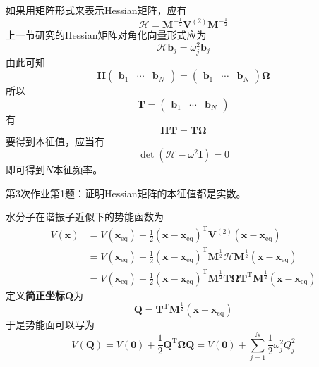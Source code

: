     如果用矩阵形式来表示Hessian矩阵，应有
    \begin{equation*}
        \bm{\mathcal{H} = M}^{-\frac 12} \bm{V}^{(2)} \bm{M}^{-\frac 12}
    \end{equation*}
    上一节研究的Hessian矩阵对角化向量形式应为
    \begin{equation*}
        \bm{\mathcal{H}b}_j = \omega_j^2 \bm{b}_j
    \end{equation*}
    由此可知 
    \begin{equation*}
        \bm{H}
        \begin{pmatrix}
            \bm{b}_1 & \cdots & \bm{b}_N
        \end{pmatrix}
        = 
        \begin{pmatrix}
            \bm{b}_1 & \cdots & \bm{b}_N
        \end{pmatrix}
        \bm{\Omega}
    \end{equation*}
    所以
    \begin{equation*}
        \bm{T} = 
        \begin{pmatrix}
            \bm{b}_1 & \cdots & \bm{b}_N
        \end{pmatrix}
    \end{equation*}
    有
    \begin{equation*}
        \bm{HT = T\Omega}
    \end{equation*}
    要得到本征值，应当有
    \begin{equation*}
        \det (\bm{\mathcal{H}}- \omega^2 \bm{I}) = 0
    \end{equation*}
    即可得到$N$本征频率。
    \begin{asg}
        第3次作业第1题：证明Hessian矩阵的本征值都是实数。
    \end{asg}

    水分子在谐振子近似下的势能函数为
    \begin{align*}
        V(\bm{x}) &= V(\bm{x}_\mathrm{eq}) + \frac 12 (\bm{x-x}_\mathrm{eq})^\mathrm{T} \bm{V}^{(2)} (\bm{x-x}_\mathrm{eq})\\
        &= V(\bm{x}_\mathrm{eq}) + \frac 12 (\bm{x-x}_\mathrm{eq})^\mathrm{T} \bm{M}^{\frac 12}\bm{\mathcal{H}} \bm{M}^{\frac 12} (\bm{x-x}_\mathrm{eq})\\
        &= V(\bm{x}_\mathrm{eq}) + \frac 12 (\bm{x-x}_\mathrm{eq})^\mathrm{T} \bm{M}^{\frac 12} \bm{T\Omega T}^\mathrm{T} \bm{M}^{\frac 12} (\bm{x-x}_\mathrm{eq})
    \end{align*}
    定义\textbf{简正坐标}$\bm{Q}$为
    \begin{equation*}
        \bm{Q} = \bm{T}^\mathrm{T} \bm{M}^{\frac 12} (\bm{x-x}_\mathrm{eq})
    \end{equation*}
    于是势能面可以写为
    \begin{equation*}
        V(\bm{Q}) = V(\bm{0}) + \frac 12 \bm{Q}^\mathrm{T} \bm{\Omega Q} = V(\bm{0}) + \sum_{j=1}^N \frac 12 \omega_j^2 Q_j^2
    \end{equation*}

